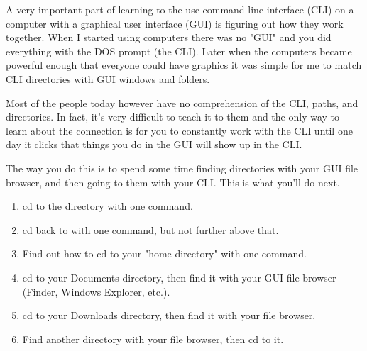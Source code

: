 A very important part of learning to the use command line interface (CLI) on a computer with a
graphical user interface (GUI) is figuring out how they work together.  When I started using
computers there was no "GUI" and you did everything with the DOS prompt (the CLI).  Later when
the computers became powerful enough that everyone could have graphics it was simple for me
to match CLI directories with GUI windows and folders.

Most of the people today however have no comprehension of the CLI, paths, and directories.
In fact, it's very difficult to teach it to them and the only way to learn about the
connection is for you to constantly work with the CLI until one day it clicks that 
things you do in the GUI will show up in the CLI.

The way you do this is to spend some time finding directories with your GUI file browser, 
and then going to them with your CLI.  This is what you'll do next.

\begin{enumerate}
\item cd to the  directory with one command.
\item cd back to  with one command, but not further above that.
\item Find out how to cd to your "home directory" with one command.
\item cd to your Documents directory, then find it with your GUI file browser (Finder, Windows Explorer, etc.).
\item cd to your Downloads directory, then find it with your file browser.
\item Find another directory with your file browser, then cd to it.
\end{enumerate}

